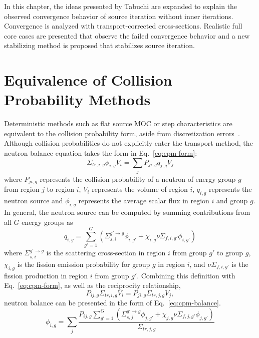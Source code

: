 In this chapter, the ideas presented by Tabuchi are expanded to explain the observed convergence behavior of source iteration without inner iterations. Convergence is analyzed with transport-corrected cross-sections. Realistic full core cases are presented that observe the failed convergence behavior and a new stabilizing method is proposed that stabilizes source iteration.

\section{Equivalence of Collision Probability Methods}
\label{sec:equiv-cpm}

Deterministic methods such as flat source \ac{MOC} or step characteristics are equivalent to the collision probability form, aside from discretization errors~\cite{ty-problem}. Although collision probabilities do not explicitly enter the transport method, the neutron balance equation takes the form in Eq.~\ref{eq:cpm-form}:
\begin{equation}
	\Sigma_{\textit{tr}, i, g} \phi_{i,g} V_i = \sum_j P_{ji, g} q_{j,g} V_j
	\label{eq:cpm-form}
\end{equation}
where $P_{ji,g}$ represents the collision probability of a neutron of energy group $g$ from region $j$ to region $i$, $V_i$ represents the volume of region $i$, $q_{i,g}$ represents the neutron source and $\phi_{i,g}$ represents the average scalar flux in region $i$ and group $g$. In general, the neutron source can be computed by summing contributions from all $G$ energy groups as
\begin{equation}
	q_{i,g} = \sum_{g'=1}^G \left( \Sigma_{s,i}^{g'\rightarrow g} \phi_{i,g'} + \chi_{i,g} \nu \Sigma_{f,i,g'} \phi_{i,g'} \right)
\end{equation}
where $\Sigma_{s,i}^{g'\rightarrow g}$ is the scattering cross-section in region $i$ from group $g'$ to group $g$, $\chi_{i,g}$ is the fission emission probability for group $g$ in region $i$, and $\nu \Sigma_{f,i,g'}$ is the fission production in region $i$ from group $g'$. Combining this definition with Eq.~\ref{eq:cpm-form}, as well as the reciprocity relationship, 
\begin{equation}
	P_{ij, g} \Sigma_{\textit{tr}, i, g} V_i = P_{ji, g} \Sigma_{\textit{tr}, j, g} V_j,
	\label{eq:reciprocity}
\end{equation}
neutron balance can be presented in the form of Eq.~\ref{eq:cpm-balance}.
\begin{equation}
	\phi_{i,g} = \sum_j \frac{P_{ij, g} \sum_{g'=1}^G \left( \Sigma_{s,j}^{g'\rightarrow g} \phi_{j,g'} + \chi_{j,g} \nu \Sigma_{f,j,g'} \phi_{j,g'} \right)}{\Sigma_{\textit{tr}, j, g}} 
	\label{eq:cpm-balance}
\end{equation}
